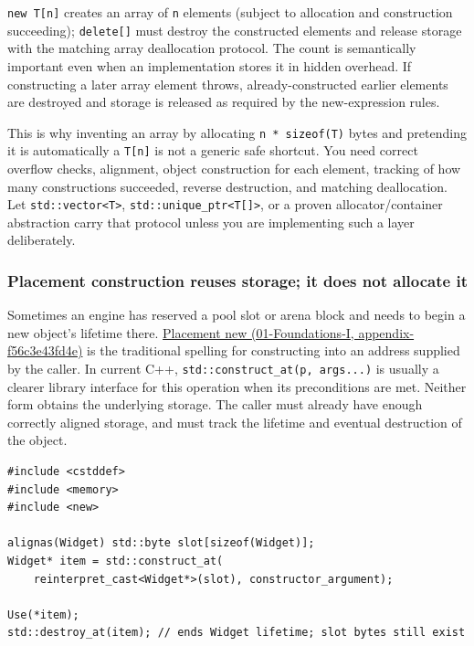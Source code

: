 \texttt{new\ T{[}n{]}} creates an array of \texttt{n} elements (subject to allocation and construction succeeding); \texttt{delete{[}{]}} must destroy the constructed elements and release storage with the matching array deallocation protocol. The count is semantically important even when an implementation stores it in hidden overhead. If constructing a later array element throws, already-constructed earlier elements are destroyed and storage is released as required by the new-expression rules.

This is why inventing an array by allocating \texttt{n\ *\ sizeof(T)} bytes and pretending it is automatically a \texttt{T{[}n{]}} is not a generic safe shortcut. You need correct overflow checks, alignment, object construction for each element, tracking of how many constructions succeeded, reverse destruction, and matching deallocation. Let \texttt{std::vector\textless{}T\textgreater{}}, \texttt{std::unique\_ptr\textless{}T{[}{]}\textgreater{}}, or a proven allocator/container abstraction carry that protocol unless you are implementing such a layer deliberately.

\subsubsection{Placement construction reuses storage; it does not allocate it}\label{placement-construction-reuses-storage-it-does-not-allocate-it}

Sometimes an engine has reserved a pool slot or arena block and needs to begin a new object's lifetime there. \href{}{Placement new (01-Foundations-I, appendix-f56c3e43fd4e)} is the traditional spelling for constructing into an address supplied by the caller. In current C++, \texttt{std::construct\_at(p,\ args...)} is usually a clearer library interface for this operation when its preconditions are met. Neither form obtains the underlying storage. The caller must already have enough correctly aligned storage, and must track the lifetime and eventual destruction of the object.

\begin{verbatim}
#include <cstddef>
#include <memory>
#include <new>

alignas(Widget) std::byte slot[sizeof(Widget)];
Widget* item = std::construct_at(
    reinterpret_cast<Widget*>(slot), constructor_argument);

Use(*item);
std::destroy_at(item); // ends Widget lifetime; slot bytes still exist
\end{verbatim}

